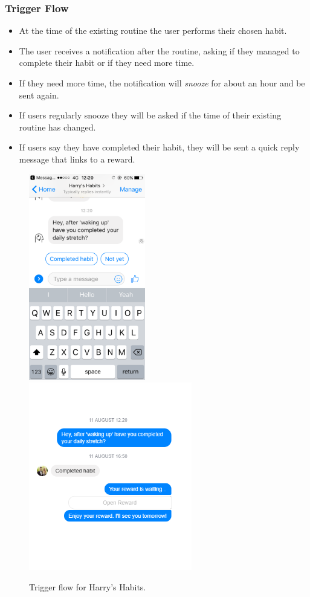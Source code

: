 \subsubsection{Trigger Flow} \label{trigger_flow}
\begin{itemize}
  \item At the time of the existing routine the user performs their chosen habit.
  \item The user receives a notification after the routine, asking if they managed to complete their habit or if they need more time.
  \item If they need more time, the notification will \textit{snooze} for about an hour and be sent again.
  \item If users regularly snooze they will be asked if the time of their existing routine has changed.
  \item If users say they have completed their habit, they will be sent a quick reply message that links to a reward.
\end{itemize}

\begin{figure}[H]
  \centering
  \includegraphics[width=2in]{resources/design/media/3.png}
  \hspace{10px}
  \includegraphics[width=2.8in]{resources/design/completed_habit.png}
  \caption{Trigger flow for Harry's Habits.}
  \label{fig:trigger_flow_screenshots}
\end{figure}



